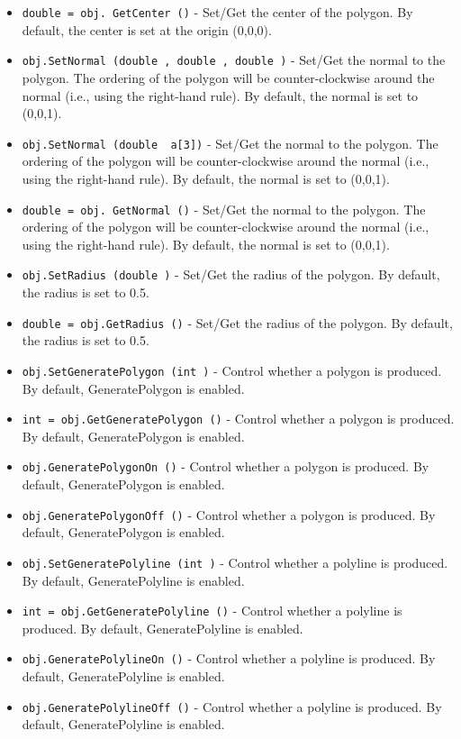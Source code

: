 \begin{itemize}
\item  \verb|double = obj. GetCenter ()| -  Set/Get the center of the polygon. By default, the center is set at the
 origin (0,0,0).

\item  \verb|obj.SetNormal (double , double , double )| -  Set/Get the normal to the polygon. The ordering of the polygon will be
 counter-clockwise around the normal (i.e., using the right-hand rule).
 By default, the normal is set to (0,0,1).

\item  \verb|obj.SetNormal (double  a[3])| -  Set/Get the normal to the polygon. The ordering of the polygon will be
 counter-clockwise around the normal (i.e., using the right-hand rule).
 By default, the normal is set to (0,0,1).

\item  \verb|double = obj. GetNormal ()| -  Set/Get the normal to the polygon. The ordering of the polygon will be
 counter-clockwise around the normal (i.e., using the right-hand rule).
 By default, the normal is set to (0,0,1).

\item  \verb|obj.SetRadius (double )| -  Set/Get the radius of the polygon. By default, the radius is set to 0.5.

\item  \verb|double = obj.GetRadius ()| -  Set/Get the radius of the polygon. By default, the radius is set to 0.5.

\item  \verb|obj.SetGeneratePolygon (int )| -  Control whether a polygon is produced. By default, GeneratePolygon is enabled.

\item  \verb|int = obj.GetGeneratePolygon ()| -  Control whether a polygon is produced. By default, GeneratePolygon is enabled.

\item  \verb|obj.GeneratePolygonOn ()| -  Control whether a polygon is produced. By default, GeneratePolygon is enabled.

\item  \verb|obj.GeneratePolygonOff ()| -  Control whether a polygon is produced. By default, GeneratePolygon is enabled.

\item  \verb|obj.SetGeneratePolyline (int )| -  Control whether a polyline is produced. By default, GeneratePolyline is enabled.

\item  \verb|int = obj.GetGeneratePolyline ()| -  Control whether a polyline is produced. By default, GeneratePolyline is enabled.

\item  \verb|obj.GeneratePolylineOn ()| -  Control whether a polyline is produced. By default, GeneratePolyline is enabled.

\item  \verb|obj.GeneratePolylineOff ()| -  Control whether a polyline is produced. By default, GeneratePolyline is enabled.

\end{itemize}
